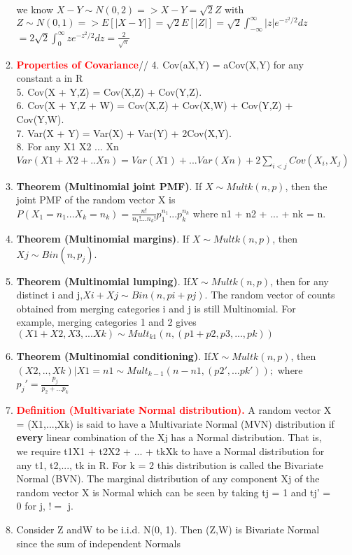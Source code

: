 \documentclass[11pt]{article}
\begin{document}
\begin{enumerate}
\begin{enumerate}
	we know $X-Y \sim N(0,2) => X-Y=\sqrt{2}Z $ with $ Z \sim N(0,1) =>
	E[|X-Y|] = \sqrt{2}E[|Z|] = \sqrt{2}\int_{-\infty}^{\infty}|z|e^{-z^2/2}dz$\\
	$=2\sqrt{2}\int_{0}^{\infty}ze^{-z^2/2}dz = \frac{2}{\sqrt{\pi}}$ \\
	\item \textcolor{red}{\textbf{Properties of Covariance}}// 
	4. Cov(aX,Y) = aCov(X,Y) for any constant a in R\\
	5. Cov(X + Y,Z) = Cov(X,Z) + Cov(Y,Z).\\
	6. Cov(X + Y,Z + W) = Cov(X,Z) + Cov(X,W) + Cov(Y,Z) + Cov(Y,W).\\
	7. Var(X + Y) = Var(X) + Var(Y) + 2Cov(X,Y).\\
	8. For any X1 X2 ... Xn  $Var(X1+X2+..Xn) = Var(X1)+...Var(Xn) + 2\sum_{i<j}Cov(X_i,X_j)$
	\item \textbf{Theorem (Multinomial joint PMF)}. If $X \sim Multk(n, p)$, then the joint PMF of the random vector X is
	$P(X_1 = n_1...X_k = n_k) = \frac{n!}{n_1!...n_k!}p_1^{n_1}...p_k^{n_k}$
	where n1 + n2 + ... + nk = n.
	\item \textbf{Theorem (Multinomial margins)}. If $X \sim Multk(n, p)$, then $Xj \sim Bin(n, p_j).$
	\item \textbf{Theorem (Multinomial lumping)}. If$X \sim Multk(n, p)$, then for any distinct i and j,$ Xi + Xj \sim Bin(n, pi + pj).$
	The random vector of counts obtained from merging categories i and j is still Multinomial. For example,	merging categories 1 and 2 gives
	$(X1 + X2, X3,... Xk) \sim Mult_{k1}(n, (p1 + p2, p3, ... , pk))$
	\item \textbf{Theorem (Multinomial conditioning)}. If$ X \sim Multk(n, p)$, then
	$(X2,..,Xk) | X1 = n1 \sim Mult_{k-1}(n - n1, (p2',...pk'));$
	where$p_j' = \frac{p_j}{p_2+...p_k}$
	\item \textcolor{red}{\textbf{Definition (Multivariate Normal distribution).}} A random vector X = (X1,...,Xk) is said to have a Multivariate Normal (MVN) distribution if \textbf{every} linear combination of the Xj has a Normal distribution. That is, we require t1X1 + t2X2 + ... + tkXk to have a Normal distribution for any t1, t2,..., tk in R. For k = 2 this distribution is called the Bivariate Normal (BVN). The marginal distribution of any component Xj of the random vector X is Normal which
	can be seen by taking tj = 1 and tj' = 0 for j, $!=$ j.
	\item Consider Z andW to be i.i.d. N(0, 1). Then (Z,W) is Bivariate Normal since the sum of independent Normals

\end{enumerate}
\end{enumerate}
\end{document}
